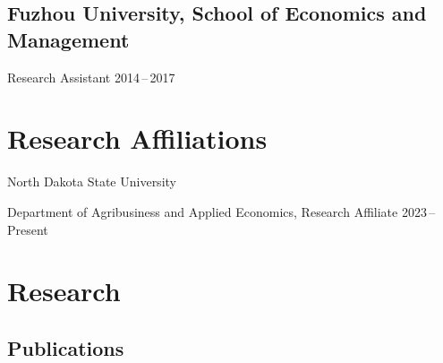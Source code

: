 \documentclass[10.5 pt,letterpaper]{article}
\renewenvironment{itemize}{
	\begin{list}{}{
			\setlength{\leftmargin}{1.5em}
		}
	}{
	\end{list}
}
\begin{document}
	\subsection*{Fuzhou University, School of Economics and Management}
	
	\begin{itemize}
		\item[-] Research Assistant 
		\hfill    2014\,--\,2017
		
	\end{itemize}
	
	
	
	
	
	
	
	
	
	
	
	\section*{\textbf{Research  Affiliations}}
	
 
		North Dakota State University 
	\begin{itemize}
		\item[-] Department of Agribusiness and Applied Economics, Research Affiliate	\hfill    2023\,--\,  Present
	\end{itemize}
 
	 
 
	
	\section*{\textbf{Research}}
	
		\subsection*{\textbf{Publications}}
		
\end{document}
